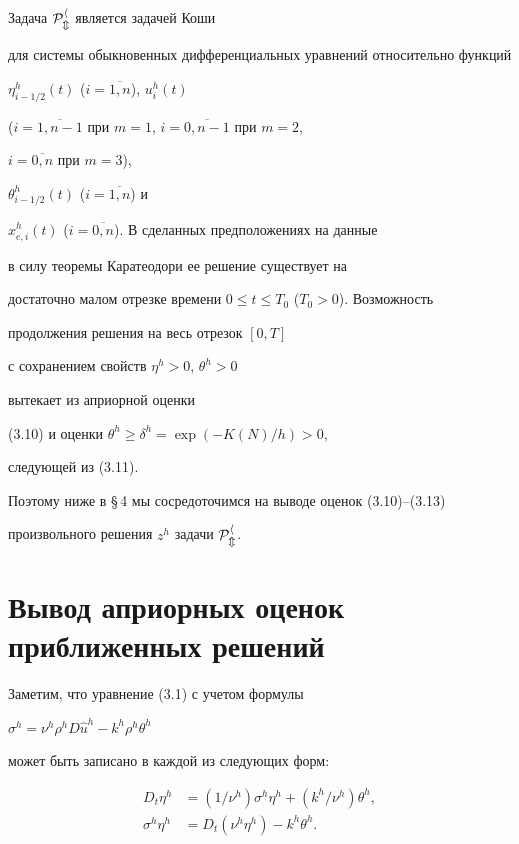 \documentclass[12pt]{article}
\theoremstyle{plain} %
\theoremstyle{definition}
\numberwithin{equation}{section}
\begin{document}
Задача $\cal P^h_m$ является задачей Коши


для системы обыкновенных дифференциальных уравнений относительно функций


$\eta^h_{i-1/2}(t)$ ($i=\overline{1,n}$), $u^h_i(t)$


($i=\overline{1,n-1}$ при $m=1$, $i=\overline{0,n-1}$ при $m=2$,


$i=\overline{0,n}$ при $m=3$),


$\theta^h_{i-1/2}(t)$ ($i=\overline{1,n}$) и


$x^h_{e,i}(t)$ ($i=\overline{0,n}$). В сделанных предположениях на данные


в силу теоремы Каратеодори \cite{Fi} ее решение существует на


достаточно малом отрезке времени $0\le t\le T_0$ ($T_0>0$). Возможность


продолжения решения на весь отрезок $[0,T]$


с сохранением свойств $\eta^h>0$, $\theta^h>0$


вытекает из априорной оценки


(3.10) и оценки $\theta^h\ge \delta^h=\exp(-K(N)/h)>0$,


следующей из (3.11).


Поэтому ниже в \S\,4 мы сосредоточимся на выводе оценок (3.10)--(3.13)


произвольного решения $z^h$ задачи $\cal P_m^h$.





\section{Вывод априорных оценок приближенных решений}





Заметим, что уравнение (3.1) с учетом формулы


$\sigma^h=\nu^h\rho^h D\widehat u^h-k^h\rho^h\theta^h$


может быть записано в каждой из следующих форм:


\begin{align}


D_t\eta^h &=(1/\nu^h)\sigma^h\eta^h+(k^h/\nu^h)\theta^h,\\


%


\sigma^h\eta^h &=D_t(\nu^h\eta^h) -k^h\theta^h.


\end{align}
\end{document}
